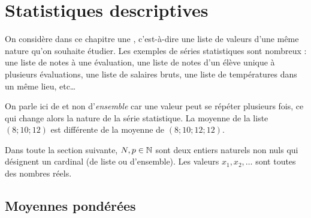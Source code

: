 
\chapter{Statistiques descriptives}
\label{chap:statistiques}


On considère dans ce chapitre une , c'est-à-dire une liste de valeurs d'une même nature qu'on souhaite étudier.
Les exemples de séries statistiques sont nombreux : une liste de notes à une évaluation, une liste de notes d'un élève unique à plusieurs évaluations, une liste de salaires bruts, une liste de températures dans un même lieu, etc…

On parle ici de  et non d'\emph{ensemble} car une valeur peut se répéter plusieurs fois, ce qui change alors la nature de la série statistique.
La moyenne de la liste $(8; 10; 12)$ est différente de la moyenne de $(8; 10; 12; 12)$.

Dans toute la section suivante, $N, p \in \mathbb{N}$ sont deux entiers naturels non nuls qui désignent un cardinal (de liste ou d'ensemble). 
Les valeurs $x_1, x_2, \dots$ sont toutes des nombres réels.


\section{Moyennes pondérées}



